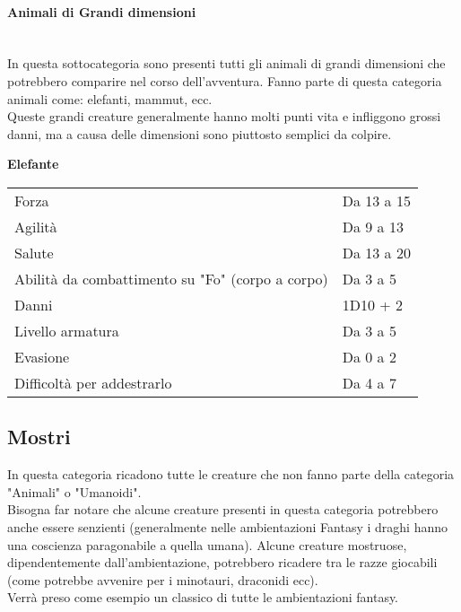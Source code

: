 \documentclass[../manuale_main.tex]{subfiles}
\begin{document}
\clearpage

\paragraph{Animali di Grandi dimensioni}\mbox{}\\
In questa sottocategoria sono presenti tutti gli animali di grandi dimensioni che potrebbero comparire nel corso dell'avventura. Fanno parte di questa categoria animali come: elefanti, mammut, ecc.\\
Queste grandi creature generalmente hanno molti punti vita e infliggono grossi danni, ma a causa delle dimensioni sono piuttosto semplici da colpire.\\

\begin{center}


\textbf{Elefante}\\
\renewcommand{\arraystretch}{1.2}
\begin{tabularx}{\linewidth}{Q F}
Forza&Da 13 a 15\\
Agilità&Da 9 a 13\\
Salute&Da 13 a 20\\
Abilità da combattimento su "Fo" (corpo a corpo)&Da 3 a 5\\
Danni&1D10 + 2\\
Livello armatura&Da 3 a 5\\
Evasione&Da 0 a 2\\
Difficoltà per addestrarlo&Da 4 a 7\\
\end{tabularx}
\end{center}


\subsection{Mostri}
In questa categoria ricadono tutte le creature che non fanno parte della categoria "Animali" o "Umanoidi".\\
Bisogna far notare che alcune creature presenti in questa categoria potrebbero anche essere senzienti (generalmente nelle ambientazioni Fantasy i draghi hanno una coscienza paragonabile a quella umana). Alcune creature mostruose, dipendentemente dall'ambientazione, potrebbero ricadere tra le razze giocabili (come potrebbe avvenire per i minotauri, draconidi ecc).\\
Verrà preso come esempio un classico di tutte le ambientazioni fantasy.
\end{document}

